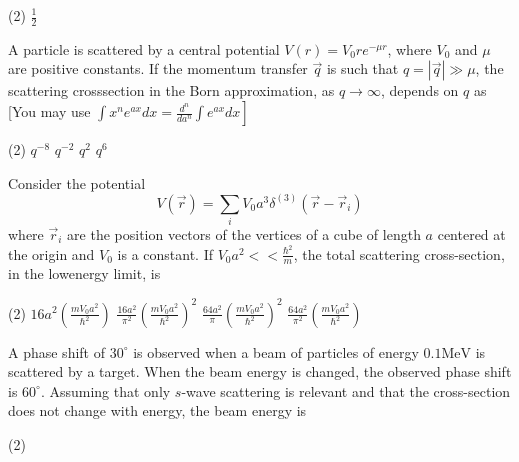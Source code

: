 \begin{enumerate}
\begin{minipage}{\textwidth}
\end{minipage}
\begin{tasks}(2)
	\task[\textbf{D.}]$\frac{1}{2}$
\end{tasks}
\begin{minipage}{\textwidth}
	\item A particle is scattered by a central potential $V(r)=V_{0} r e^{-\mu r}$, where $V_{0}$ and $\mu$ are positive constants. If the momentum transfer $\vec{q}$ is such that $q=|\vec{q}| \gg \mu$, the scattering crosssection in the Born approximation, as $q \rightarrow \infty$, depends on $q$ as
	[You may use $\left.\int x^{n} e^{a x} d x=\frac{d^{n}}{d a^{n}} \int e^{a x} d x\right]$
\end{minipage}
\begin{tasks}(2)
	\task[\textbf{A.}]$q^{-8}$
	\task[\textbf{B.}]$q^{-2}$
	\task[\textbf{C.}]$q^{2}$
	\task[\textbf{D.}]$q^{6}$
\end{tasks}
\begin{minipage}{\textwidth}
	\item Consider the potential
	$$
	V(\vec{r})=\sum_{i} V_{0} a^{3} \delta^{(3)}\left(\vec{r}-\vec{r}_{i}\right)
	$$
	where $\vec{r}_{i}$ are the position vectors of the vertices of a cube of length $a$ centered at the origin and $V_{0}$ is a constant. If $V_{0} a^{2}<<\frac{\hbar^{2}}{m}$, the total scattering cross-section, in the lowenergy limit, is
\end{minipage}
\begin{tasks}(2)
	\task[\textbf{A.}] $16 a^{2}\left(\frac{m V_{0} a^{2}}{\hbar^{2}}\right)$
	\task[\textbf{B.}]$\frac{16 a^{2}}{\pi^{2}}\left(\frac{m V_{0} a^{2}}{\hbar^{2}}\right)^{2}$
	\task[\textbf{C.}]$\frac{64 a^{2}}{\pi}\left(\frac{m V_{0} a^{2}}{\hbar^{2}}\right)^{2}$
	\task[\textbf{D.}]$\frac{64 a^{2}}{\pi^{2}}\left(\frac{m V_{0} a^{2}}{\hbar^{2}}\right)$
\end{tasks}
\begin{minipage}{\textwidth}
	\item A phase shift of $30^{\circ}$ is observed when a beam of particles of energy $0.1 \mathrm{MeV}$ is scattered by a target. When the beam energy is changed, the observed phase shift is $60^{\circ}$. Assuming that only $s$-wave scattering is relevant and that the cross-section does not change with energy, the beam energy is
\end{minipage}
\begin{tasks}(2)

\end{tasks}
\end{enumerate}
